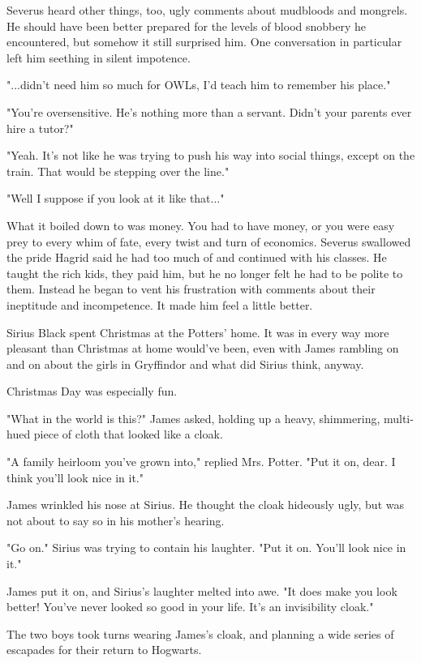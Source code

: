 \documentclass[a4paper,11pt]{article}
\begin{document}
Severus heard other things, too, ugly comments about mudbloods and mongrels. He should have been better prepared for the levels of blood snobbery he encountered, but somehow it still surprised him. One conversation in particular left him seething in silent impotence.

"...didn't need him so much for OWLs, I'd teach him to remember his place."

"You're oversensitive. He's nothing more than a servant. Didn't your parents ever hire a tutor?"

"Yeah. It's not like he was trying to push his way into social things, except on the train. That would be stepping over the line."

"Well I suppose if you look at it like that..."

What it boiled down to was money. You had to have money, or you were easy prey to every whim of fate, every twist and turn of economics. Severus swallowed the pride Hagrid said he had too much of and continued with his classes. He taught the rich kids, they paid him, but he no longer felt he had to be polite to them. Instead he began to vent his frustration with comments about their ineptitude and incompetence. It made him feel a little better.

Sirius Black spent Christmas at the Potters' home. It was in every way more pleasant than Christmas at home would've been, even with James rambling on and on about the girls in Gryffindor and what did Sirius think, anyway.

Christmas Day was especially fun.

"What in the world is this?" James asked, holding up a heavy, shimmering, multi-hued piece of cloth that looked like a cloak.

"A family heirloom you've grown into," replied Mrs. Potter. "Put it on, dear. I think you'll look nice in it."

James wrinkled his nose at Sirius. He thought the cloak hideously ugly, but was not about to say so in his mother's hearing.

"Go on." Sirius was trying to contain his laughter. "Put it on. You'll look nice in it."

James put it on, and Sirius's laughter melted into awe. "It does make you look better! You've never looked so good in your life. It's an invisibility cloak."

The two boys took turns wearing James's cloak, and planning a wide series of escapades for their return to Hogwarts.
\end{document}
